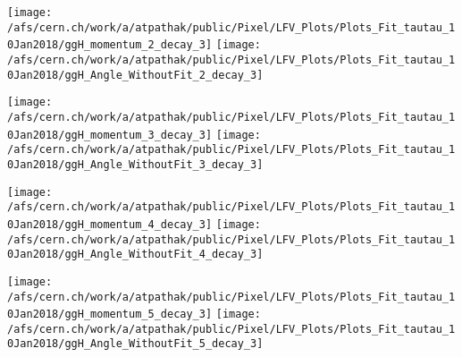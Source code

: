 \documentclass{beamer}
\begin{document}
\begin{frame}
\begin{normalsize}
\begin{center}
\texttt{[image: /afs/cern.ch/work/a/atpathak/public/Pixel/LFV\_Plots/Plots\_Fit\_tautau\_10Jan2018/ggH\_momentum\_2\_decay\_3]}
\texttt{[image: /afs/cern.ch/work/a/atpathak/public/Pixel/LFV\_Plots/Plots\_Fit\_tautau\_10Jan2018/ggH\_Angle\_WithoutFit\_2\_decay\_3]} 
\end{center}
\end{normalsize}
\end {frame}
\begin{frame}
\begin{normalsize}
\begin{center}
\texttt{[image: /afs/cern.ch/work/a/atpathak/public/Pixel/LFV\_Plots/Plots\_Fit\_tautau\_10Jan2018/ggH\_momentum\_3\_decay\_3]}
\texttt{[image: /afs/cern.ch/work/a/atpathak/public/Pixel/LFV\_Plots/Plots\_Fit\_tautau\_10Jan2018/ggH\_Angle\_WithoutFit\_3\_decay\_3]} 
\end{center}
\end{normalsize}
\end {frame}
\begin{frame}
\begin{normalsize}
\begin{center}
\texttt{[image: /afs/cern.ch/work/a/atpathak/public/Pixel/LFV\_Plots/Plots\_Fit\_tautau\_10Jan2018/ggH\_momentum\_4\_decay\_3]}
\texttt{[image: /afs/cern.ch/work/a/atpathak/public/Pixel/LFV\_Plots/Plots\_Fit\_tautau\_10Jan2018/ggH\_Angle\_WithoutFit\_4\_decay\_3]} 
\end{center}
\end{normalsize}
\end {frame}
\begin{frame}
\begin{normalsize}
\begin{center}
\texttt{[image: /afs/cern.ch/work/a/atpathak/public/Pixel/LFV\_Plots/Plots\_Fit\_tautau\_10Jan2018/ggH\_momentum\_5\_decay\_3]}
\texttt{[image: /afs/cern.ch/work/a/atpathak/public/Pixel/LFV\_Plots/Plots\_Fit\_tautau\_10Jan2018/ggH\_Angle\_WithoutFit\_5\_decay\_3]} 
\end{center}
\end{normalsize}
\end {frame}
\end{document}
